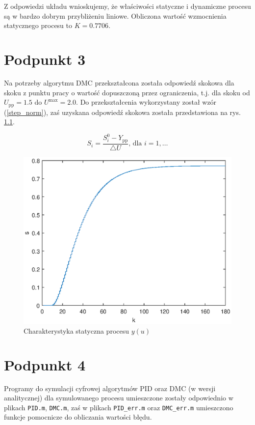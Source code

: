 Z odpowiedzi układu wnioskujemy, że właściwości statyczne i dynamiczne procesu są w bardzo dobrym przybliżeniu liniowe. Obliczona wartość wzmocnienia statycznego procesu to $K=\num{0,7706}$.


\chapter{Podpunkt 3}
Na potrzeby algorytmu DMC przekształcona została odpowiedź skokowa dla skoku z punktu pracy o wartość dopuszczoną przez ograniczenia, t.j. dla skoku od $U_{\mathrm{pp}}=\num{1,5}$ do $U^{\mathrm{max}}=\num{2,0}$. Do przekształcenia wykorzystany został wzór (\ref{step_norm}), zaś uzyskana odpowiedź skokowa została przedstawiona na rys. \ref{Z3step}.

\begin{equation}
S_i = \frac{S_i^0 - Y_{\mathrm{pp}}}{\triangle U} \textrm{, dla } i=1,\ldots
\label{step_norm}
\end{equation}


\begin{figure}[ht]
\centering
\includegraphics[scale=1]{images/Z3step}
\caption{Charakterystyka statyczna procesu $y(u)$}
\label{Z3step}
\end{figure}


\chapter{Podpunkt 4}
Programy do symulacji cyfrowej algorytmów PID oraz DMC (w wersji analitycznej) dla symulowanego procesu umieszczone zostały odpowiednio w plikach \verb+PID.m+, \verb+DMC.m+, zaś w plikach \verb+PID_err.m+ oraz \verb+DMC_err.m+ umieszczono funkcje pomocnicze do obliczania wartości błędu.


